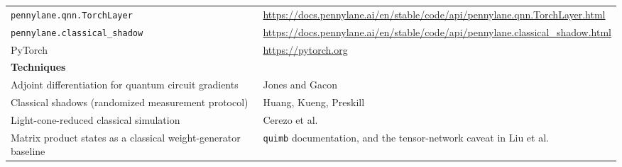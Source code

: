 \documentclass[10pt,a4paper]{article}
\begin{document}
\begin{center}
\begin{tabular}{@{}p{}p{}@{}}
\texttt{pennylane.qnn.TorchLayer} & \url{https://docs.pennylane.ai/en/stable/code/api/pennylane.qnn.TorchLayer.html} \\
\texttt{pennylane.classical\_shadow} & \url{https://docs.pennylane.ai/en/stable/code/api/pennylane.classical_shadow.html} \\
PyTorch & \url{https://pytorch.org} \\[4pt]
\textbf{Techniques} & \\
\hline
Adjoint differentiation for quantum circuit gradients & Jones and Gacon \cite{jonesgacon2020} \\
Classical shadows (randomized measurement protocol) & Huang, Kueng, Preskill \cite{huang2020} \\
Light-cone-reduced classical simulation & Cerezo et al.\ \cite{cerezo2025} \\
Matrix product states as a classical weight-generator baseline & \texttt{quimb} documentation, and the tensor-network caveat in Liu et al.\ \cite{liu2024} \\
\end{tabular}
\end{center}
\end{document}

